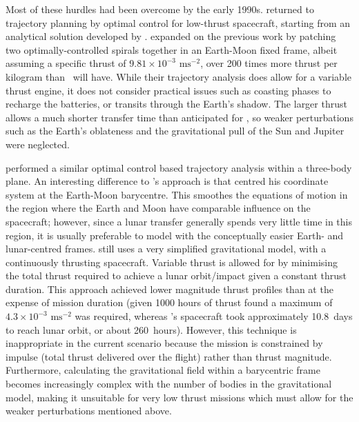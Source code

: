 Most of these hurdles had been overcome by the early 1990s. \textcite{Golan1994} returned to trajectory planning by optimal control for low-thrust spacecraft, starting from an analytical solution developed by \textcite{Breakwell1966}. \citeauthor{Golan1994} expanded on the previous work by patching two optimally-controlled spirals together in an Earth-Moon fixed frame, albeit assuming a specific thrust of $9.81\times10^{-3}\text{ ms}^{-2}$, over 200 times more thrust per kilogram than \BW\ will have. While their trajectory analysis does allow for a variable thrust engine, it does not consider practical issues such as coasting phases to recharge the batteries, or transits through the Earth's shadow. The larger thrust allows a much shorter transfer time than anticipated for \BW, so weaker perturbations such as the Earth's oblateness and the gravitational pull of the Sun and Jupiter were neglected.

\textcite{Guelman1995} performed a similar optimal control based trajectory analysis within a three-body plane. An interesting difference to \citeauthor{Golan1994}'s approach is that \citeauthor{Guelman1995} centred his coordinate system at the Earth-Moon barycentre. This smoothes the equations of motion in the region where the Earth and Moon have comparable influence on the spacecraft; however, since a lunar transfer generally spends very little time in this region, it is usually preferable to model with the conceptually easier Earth- and lunar-centred frames. \citeauthor{Guelman1995} still uses a very simplified gravitational model, with a continuously thrusting spacecraft. Variable thrust is allowed for by minimising the total thrust required to achieve a lunar orbit/impact given a constant thrust duration. This approach achieved lower magnitude thrust profiles than \citeauthor{Golan1994} at the expense of mission duration (given 1000 hours of thrust \citeauthor{Guelman1995} found a maximum of $4.3\times10^{-3}\text{ ms}^{-2}$ was required, whereas \citeauthor{Golan1994}'s spacecraft took approximately 10.8~days to reach lunar orbit, or about 260~hours). However, this technique is inappropriate in the current scenario because the mission is constrained by impulse (total thrust delivered over the flight) rather than thrust magnitude. Furthermore, calculating the gravitational field within a barycentric frame becomes increasingly complex with the number of bodies in the gravitational model, making it unsuitable for very low thrust missions which must allow for the weaker perturbations mentioned above.

